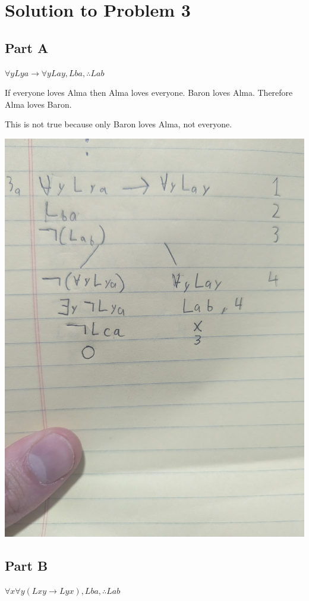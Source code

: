\documentclass[12pt]{article}
\begin{document}
\section*{Solution to Problem 3}


\subsection*{Part A}

$\forall y Lya \rightarrow \forall y Lay, Lba, \therefore Lab$

If everyone loves Alma then Alma loves everyone. Baron loves Alma. Therefore Alma loves Baron. 

This is not true because only Baron loves Alma, not everyone. 

\includegraphics[width=\textwidth]{3a}

\subsection*{Part B}
$\forall x \forall y (Lxy \rightarrow Lyx), Lba, \therefore Lab$
\end{document}
